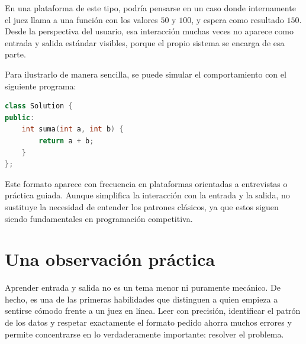 En una plataforma de este tipo, podría pensarse en un caso donde internamente el juez llama a una función con los valores \(50\) y \(100\), y espera como resultado \(150\). Desde la perspectiva del usuario, esa interacción muchas veces no aparece como entrada y salida estándar visibles, porque el propio sistema se encarga de esa parte.


Para ilustrarlo de manera sencilla, se puede simular el comportamiento con el siguiente programa:

\begin{lstlisting}[language=C++]
class Solution {
public:
    int suma(int a, int b) {
        return a + b;
    }
};
\end{lstlisting}

Este formato aparece con frecuencia en plataformas orientadas a entrevistas o práctica guiada. Aunque simplifica la interacción con la entrada y la salida, no sustituye la necesidad de entender los patrones clásicos, ya que estos siguen siendo fundamentales en programación competitiva.

\section{Una observación práctica}

Aprender entrada y salida no es un tema menor ni puramente mecánico. De hecho, es una de las primeras habilidades que distinguen a quien empieza a sentirse cómodo frente a un juez en línea. Leer con precisión, identificar el patrón de los datos y respetar exactamente el formato pedido ahorra muchos errores y permite concentrarse en lo verdaderamente importante: resolver el problema.
